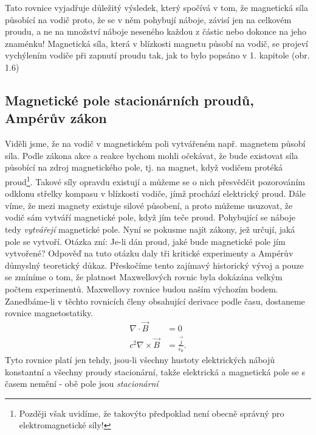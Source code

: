       Tato rovnice vyjadřuje důležitý výsledek, který spočívá v tom, že magnetická síla působící 
      na vodič proto, že se v něm pohybují náboje, závisí jen na celkovém proudu, a ne na množství 
      náboje neseného každou z částic nebo dokonce na jeho znaménku! Magnetická síla, která v 
      blízkosti magnetu působí na vodič, se projeví vychýlením vodiče při zapnutí proudu tak, jak 
      to bylo popsáno v 1. kapitole (obr. 1.6)

    \subsection{Magnetické pole stacionárních proudů, Ampérův zákon}
      Viděli jsme, že na vodič v magnetickém poli vytvářeném např. magnetem působí síla. Podle 
      zákona akce a reakce bychom mohli očekávat, že bude existovat síla působící na zdroj 
      magnetického pole, tj. na magnet, když vodičem protéká proud\footnote{Později však uvidíme, 
      že takovýto předpoklad není obecně správný pro elektromagnetické síly!}. Takové síly opravdu 
      existují a můžeme se o nich přesvědčit pozorováním odklonu střelky kompasu v blízkosti 
      vodiče, jímž prochází elektrický proud. Dále víme, že mezi magnety existuje silové působení, 
      a proto můžeme usuzovat, že vodič sám vytváří magnetické pole, když jím teče proud. 
      Pohybující se náboje tedy \emph{vytvářejí} magnetické pole. Nyní se pokusme najít zákony, 
      jež určují, jaká pole se vytvoří. Otázka zní: Je-li dán proud, jaké bude magnetické pole jím 
      vytvořené? Odpověď na tuto otázku daly tři kritické experimenty a Ampérův důmyslný 
      teoretický důkaz. Přeskočíme tento zajímavý historický vývoj a pouze se zmíníme o tom, že 
      platnost Maxwellových rovnic byla dokázána velkým počtem experimentů. Maxwellovy rovnice 
      budou naším výchozím bodem. Zanedbáme-li v těchto rovnicích členy obsahující derivace podle 
      času, dostaneme rovnice magnetostatiky.
      \begin{align}
        \nabla\cdot\vec{B}     &= 0                            \label{fyz:eq_mag011} \\
        c^2\nabla\times\vec{B} &= \frac{\vec{j}}{\epsilon_0}.  \label{fyz:eq_mag012}
      \end{align}
      Tyto rovnice platí jen tehdy, jsou-li všechny hustoty elektrických nábojů konstantní a 
      všechny proudy stacionární, takže elektrická a magnetická pole se s časem nemění - obě pole 
      jsou \emph{stacionární}
      
